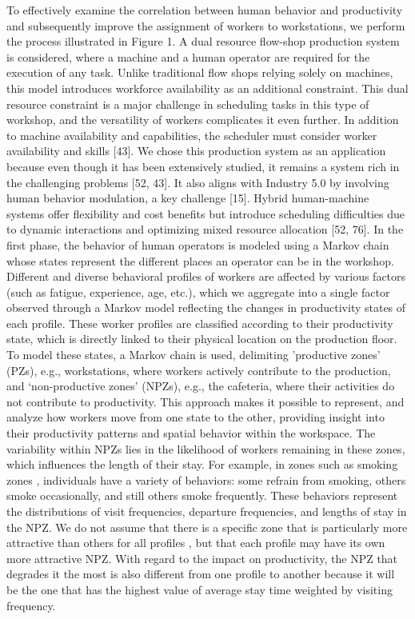 To effectively examine the correlation between human behavior and productivity and subsequently improve the assignment of workers to workstations, we perform the process illustrated in Figure 1. A dual resource flow-shop production system is considered, where a machine and a human operator are required for the execution of any task. Unlike traditional flow shops relying solely on machines, this model introduces workforce availability as an additional constraint. This dual resource constraint is a major challenge in scheduling tasks in this type of workshop, and the versatility of workers complicates it even further. In addition to machine availability and capabilities, the scheduler must consider worker availability and skills [43]. We chose this production system as an application because even though it has been extensively studied, it remains a system rich in the challenging problems [52, 43]. It also aligns with Industry 5.0 by involving human behavior modulation, a key challenge [15]. Hybrid human-machine systems offer flexibility and cost benefits but introduce scheduling difficulties due to dynamic interactions and optimizing mixed resource allocation [52, 76].
In the first phase, the behavior of human operators is modeled using a Markov chain whose states represent the different places an operator can be in the workshop. Different and diverse behavioral profiles of workers are affected by various factors (such as fatigue, experience, age, etc.), which we aggregate into a single factor observed through a Markov model reflecting the changes in productivity states of each profile. These worker profiles are classified according to their productivity state, which is directly linked to their physical location on the production floor. To model these states, a Markov chain is used, delimiting ’productive zones’ (PZs), e.g., workstations, where workers actively contribute to the production, and ‘non-productive zones’ (NPZs), e.g., the cafeteria, where their activities do not contribute to productivity. This approach makes it possible to represent, and analyze how workers move from one state to the other, providing insight into their productivity patterns and spatial behavior within the workspace. The variability within NPZs lies in the likelihood of workers remaining in these zones, which influences the length of their stay. For example, in zones such as smoking zones , individuals have a variety of behaviors: some refrain from smoking, others smoke occasionally, and still others smoke frequently. These behaviors represent the distributions of visit frequencies, departure frequencies, and lengths of stay in the NPZ. We do not assume that there is a specific zone that is particularly more attractive than others for all profiles , but that each profile may have its own more attractive NPZ. With regard to the impact on productivity, the NPZ that degrades it the most is also different from one profile to another because it will be the one that has the highest value of average stay time weighted by visiting frequency.
